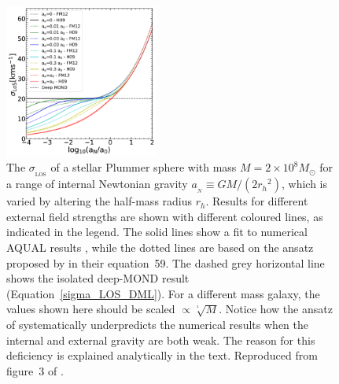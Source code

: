 \documentclass[fleqn,usenatbib,useAMS,onecolumn]{mnras} %
\begin{document}
\begin{figure}
	\centering
	\includegraphics[width=0.45\textwidth]{Haghi_2019_DF2_Figure_3}
	\caption{The $\sigma_{_\text{LOS}}$ of a stellar Plummer sphere \citep{Plummer_1911} with mass $M = 2 \times 10^8 M_\odot$ for a range of internal Newtonian gravity $a_{_N} \equiv GM/\left(2 {r_h}^2 \right)$, which is varied by altering the half-mass radius $r_h$. Results for different external field strengths are shown with different coloured lines, as indicated in the legend. The solid lines show a fit to numerical AQUAL results \citep{Haghi_2009}, while the dotted lines are based on the ansatz proposed by \citet{Famaey_McGaugh_2012} in their equation~59. The dashed grey horizontal line shows the isolated deep-MOND result (Equation~\ref{sigma_LOS_DML}). For a different mass galaxy, the values shown here should be scaled $\propto\sqrt[^4]{M}$. Notice how the ansatz of \citet{Famaey_McGaugh_2012} systematically underpredicts the numerical results when the internal and external gravity are both weak. The reason for this deficiency is explained analytically in the text. Reproduced from figure~3 of \citet{Haghi_2019_DF2}.}
	\label{Haghi_2019_DF2_Figure_3}
\end{figure}
\end{document}
